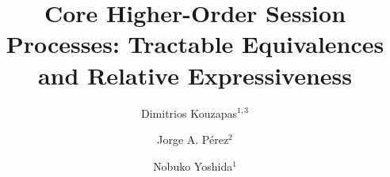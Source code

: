 \documentclass[runningheads,envcountsect,orivec]{llncs}
\begin{document}


\title {
	Core Higher-Order Session Processes:
	Tractable Equivalences and Relative Expressiveness
}\titlerunning{\today}\authorrunning{\today}
\author{
	Dimitrios Kouzapas${}^{1,3}$
        \and 
        Jorge A. P\'{e}rez${}^2$ 
	\and
	Nobuko Yoshida${}^1$
}
\maketitle
%


%




%




%











%

%

%






\appendix





%
%
%
\end{document}
